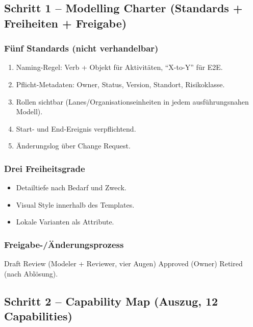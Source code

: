 \documentclass[11pt,a4paper,oneside]{article}
\begin{document}
\subsection{Schritt 1 -- Modelling Charter (Standards + Freiheiten + Freigabe)}

\subsubsection{Fünf Standards (nicht verhandelbar)}

\begin{enumerate}
  \item Naming-Regel: Verb + Objekt für Aktivitäten, ``X-to-Y'' für E2E.
  \item Pflicht-Metadaten: Owner, Status, Version, Standort, Risikoklasse.
  \item Rollen sichtbar (Lanes/Organisationseinheiten in jedem ausführungsnahen Modell).
  \item Start- und End-Ereignis verpflichtend.
  \item Änderungslog über Change Request.
\end{enumerate}

\subsubsection{Drei Freiheitsgrade}

\begin{itemize}
  \item Detailtiefe nach Bedarf und Zweck.
  \item Visual Style innerhalb des Templates.
  \item Lokale Varianten als Attribute.
\end{itemize}

\subsubsection{Freigabe-/Änderungsprozess}

Draft \textrightarrow{} Review (Modeler + Reviewer, vier Augen) \textrightarrow{} Approved (Owner) \textrightarrow{} Retired (nach Ablösung).

\subsection{Schritt 2 -- Capability Map (Auszug, 12 Capabilities)}
\end{document}
